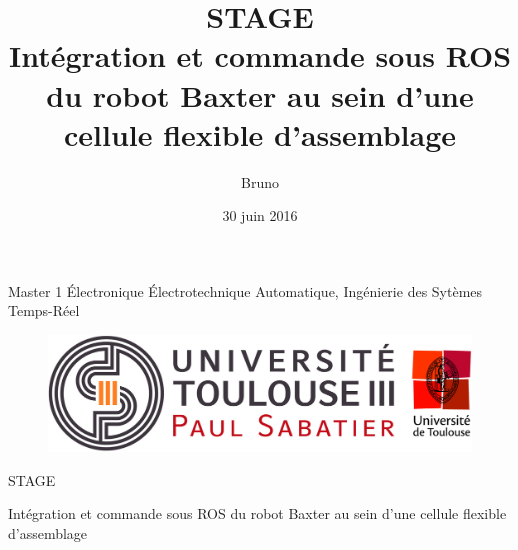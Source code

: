 \documentclass[a4paper,french, titlepage]{article}
\title{{\Huge STAGE}\\Intégration et commande sous ROS du robot Baxter au sein d’une cellule flexible d’assemblage\\}
\author{Bruno \bsc{Dato}}
\date{30 juin 2016}
\begin{document}
 
\thispagestyle{empty}

\begin{center}
Master 1 Électronique Électrotechnique Automatique, Ingénierie des Sytèmes Temps-Réel  
\vspace{0.5cm}

\begin{figure}[H] 
\begin{center}
\includegraphics[scale=0.3]{Images/logo_ups.jpg} 
\end{center}
\end{figure}





\vspace{0.3cm}

{\Huge STAGE}\\

\vspace{0.3cm}

{\Huge Intégration et commande sous ROS du robot Baxter au sein d’une cellule flexible d’assemblage}\\

\vspace{0.5cm}


\end{center}
\end{document}
